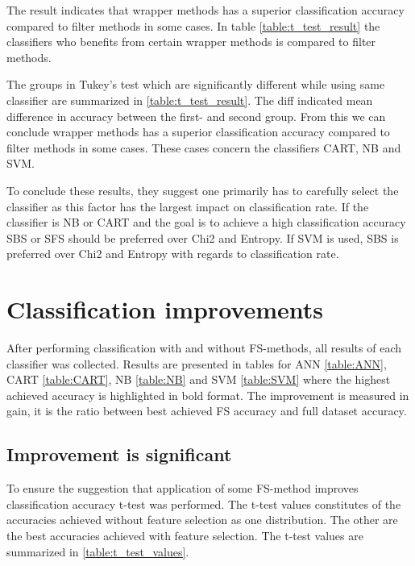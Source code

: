 The result indicates that wrapper methods has a superior classification accuracy compared to filter methods in some cases. In table \ref{table:t_test_result} the classifiers who benefits from certain wrapper methods is compared to filter methods.

The groups in Tukey's test which are significantly different while using same classifier are summarized in \ref{table:t_test_result}. The diff indicated mean difference in accuracy between the first- and second group. From this we can conclude wrapper methods has a superior classification accuracy compared to filter methods in some cases. These cases concern the classifiers CART, NB and SVM.



To conclude these results, they suggest one primarily has to carefully select the classifier as this factor has the largest impact on classification rate. If the classifier is NB or CART and the goal is to achieve a high classification accuracy SBS or SFS should be preferred over Chi2 and Entropy. If SVM is used, SBS is preferred over Chi2 and Entropy with regards to classification rate.

\section{Classification improvements}

After performing classification with and without FS-methods, all results of each classifier was collected. Results are presented in tables for ANN \ref{table:ANN}, CART \ref{table:CART}, NB \ref{table:NB} and SVM \ref{table:SVM} where the highest achieved accuracy is highlighted in bold format. The improvement is measured in gain, it is the ratio between best achieved FS accuracy and full dataset accuracy.



\subsection{Improvement is significant}

To ensure the suggestion that application of some FS-method improves classification accuracy t-test was performed. The t-test values constitutes of the accuracies achieved without feature selection as one distribution. The other are the best accuracies achieved with feature selection. The t-test values are summarized in \ref{table:t_test_values}.


